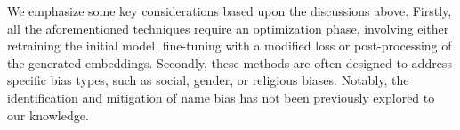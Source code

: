 We  emphasize some key considerations based upon the discussions above. Firstly, all the aforementioned techniques require an optimization phase, involving either retraining the initial model, fine-tuning with a modified loss or post-processing of the generated embeddings. Secondly, these methods are often designed to address specific bias types, such as social, gender, or religious biases. Notably, the identification and mitigation of name bias has not been previously explored to our knowledge.